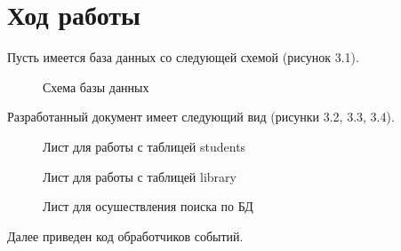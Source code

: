 \section{Ход работы}

Пусть имеется база данных со следующей схемой (рисунок 3.1).

\begin{figure}[h!]
  \caption{Схема базы данных}
\end{figure}

Разработанный документ имеет следующий вид (рисунки 3.2, 3.3, 3.4).

\begin{figure}[h!]
  \caption{Лист для работы с таблицей students}
\end{figure}


\begin{figure}[h!]
  \caption{Лист для работы с таблицей library}
\end{figure}

\newpage

\begin{figure}[h!]
  \caption{Лист для осушествления поиска по БД}
\end{figure}

Далее приведен код обработчиков событий.

